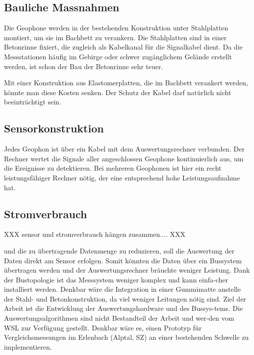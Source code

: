 \subsection{Bauliche Massnahmen}
Die Geophone werden in der bestehenden Konstruktion unter Stahlplatten montiert, um sie im Bachbett zu verankern. Die Stahlplatten sind in einer Betonrinne fixiert, die zugleich als Kabelkanal für die Signalkabel dient. Da die Messstationen häufig im Gebirge oder schwer zugänglichem Gelände erstellt werden, ist schon der Bau der Betonrinne sehr teuer.

Mit einer Konstruktion aus Elastomerplatten, die im Bachbett verankert werden, könnte man diese Kosten senken. Der Schutz der Kabel darf natürlich nicht beeinträchtigt sein.

\subsection{Sensorkonstruktion}
Jedes Geophon ist über ein Kabel mit dem Auswertungsrechner verbunden. Der Rechner wertet die Signale aller angeschlossen Geophone kontinuierlich aus, um die Ereignisse zu detektieren. Bei mehreren Geophonen ist hier ein recht leistungsfähiger Rechner nötig, der eine entsprechend hohe Leistungsaufnahme hat. 

\subsection{Stromverbrauch}
XXX sensor und stromverbrauch hängen zusammen.... XXX

 und die zu übertragende Datenmenge zu reduzieren, soll die Auswertung der Daten direkt am Sensor erfolgen. Somit könnten die Daten über ein Bussystem übertragen werden und der Auswertungsrechner bräuchte weniger Leistung.
Dank der Bustopologie ist das Messsystem weniger komplex und kann einfa-cher installiert werden. Denkbar wäre die Integration in einer Gummimatte anstelle der Stahl- und Betonkonstruktion, da viel weniger Leitungen nötig sind.
Ziel der Arbeit ist die Entwicklung der Auswertungshardware und des Bussys-tems. Die Auswertungsalgorithmen sind nicht Bestandteil der Arbeit und wer-den vom WSL zur Verfügung gestellt.
Denkbar wäre es, einen Prototyp für Vergleichsmessungen im Erlenbach (Alptal, SZ) an einer bestehenden Schwelle zu implementieren.





